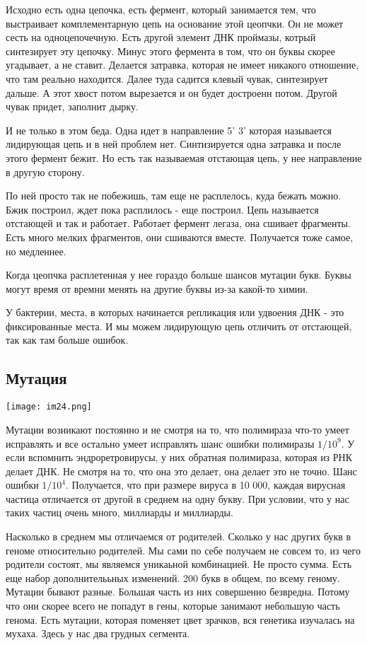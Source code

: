 Исходно есть одна цепочка, есть фермент, который занимается тем, что выстраивает 
комплементарную цепь на основание этой цеопчки. Он не может 
сесть на одноцепочечную. Есть другой элемент ДНК проймазы, котрый 
синтезирует эту цепочку. Минус этого 
фермента в том, что он буквы скорее угадывает, а не ставит. Делается 
затравка, которая не имеет никакого отношение, что там реально находится. 
Далее туда садится клевый чувак, синтезирует дальше. А этот хвост потом вырезается и он 
будет достроенн потом. Другой чувак придет, заполнит дырку. 

И не только в этом беда. Одна идет в направление 5' 3' которая называется лидирующая цепь и 
в ней проблем нет. Синтизируется одна затравка и после этого 
фермент бежит. Но есть так называемая отстающая цепь, у нее направление в другую сторону. 

По ней просто так не побежишь, там еще не расплелось, куда бежать можно. Бжик построил, 
ждет пока расплилось - еще построил. Цепь называется отстающей и так и работает. 
Работает фермент легаза, она сшивает фрагменты. Есть много мелких фрагментов, они 
сшиваются вместе. Получается тоже самое, но медленнее. 

Когда цеопчка расплетенная у нее гораздо больше шансов мутации букв. Буквы могут время от времни 
менять на другие буквы из-за какой-то химии. 

У бактерии, места, в которых начинается репликация или удвоения ДНК - это 
фиксированные места. И мы можем лидирующую цепь отличить от отстающей, 
так как там больше ошибок. 

\subsection{Мутация}
\texttt{[image: im24.png]}

Мутации возникают постоянно и не смотря на то, что 
полимираза что-то умеет исправлять и все остально умеет исправлять
шанс ошибки полимиразы $1/10^9$. У если вспомнить 
эндроретровирусы, у них обратная полимираза, 
которая из РНК делает ДНК. Не смотря на то, что она 
это делает, она делает это не точно. Шанс ошибки $1/10^4$. 
Получается, что при размере вируса в 10 000, каждая вирусная 
частица отличается от другой в среднем на одну букву. При 
условии, что у нас таких частиц очень много, миллиарды и миллиарды. 

Насколько в среднем мы отличаемся от родителей. Сколько у
нас других букв в геноме относительно родителей. Мы сами по себе 
получаем не совсем то, из чего родители состоят, мы являемся уникаьной комбинацией. 
Не просто сумма. Есть еще набор дополнителььных изменений. 200 букв в общем, 
по всему геному. Мутации бывают разные. 
Большая часть из них совершенно безвредна. Потому что они скорее всего 
не попадут в гены, которые занимают небольшую часть генома. Есть мутации, 
которая поменяет цвет зрачков, вся генетика изучалась на мухаха. Здесь 
у нас два грудных сегмента. 

